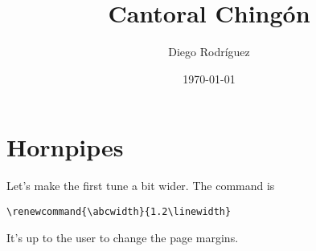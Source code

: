 \documentclass[a4paper,12pt]{article}
\begin{document}
\title{Cantoral Chingón}

\author{Diego Rodríguez}

\date{\today}

\maketitle

\tableofcontents


\section{Hornpipes}

Let's make the first tune a bit wider. The command is

\begin{verbatim}
\renewcommand{\abcwidth}{1.2\linewidth}
\end{verbatim}

It's up to the user to change the page margins.

\bigskip

\renewcommand{\abcwidth}{1.1\linewidth}






\end{document}
